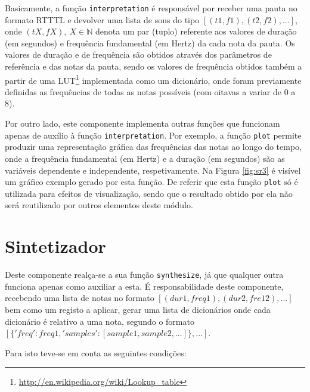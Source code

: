 \documentclass[a4paper,11pt,openright,oneside]{report}
\begin{document}
Basicamente, a função \verb|interpretation| é responsável por receber uma pauta no formato RTTTL e devolver uma lista de sons do tipo $[(t1, f1), (t2, f2), ...]$, onde $(tX, fX),\ X \in \mathbb{N}$ denota um par (tuplo) referente aos valores de duração (em segundos) e frequência fundamental (em Hertz) da cada nota da pauta. Os valores de duração e de frequência são obtidos através dos parâmetros de referência e das notas da pauta, sendo os valores de frequência obtidos também a partir de uma LUT\footnote{\url{http://en.wikipedia.org/wiki/Lookup_table}} implementada como um dicionário, onde foram previamente definidas as frequências de todas as notas possíveis (com oitavas a variar de 0 a 8).

Por outro lado, este componente implementa outras funções que funcionam apenas de auxílio à função \verb|interpretation|. Por exemplo, a função \verb|plot| permite produzir uma representação gráfica das frequências das notas ao longo do tempo, onde a frequência fundamental (em Hertz) e a duração (em segundos) são as variáveis dependente e independente, respetivamente. Na Figura \ref{fig:sr3} é visível um gráfico exemplo gerado por esta função. De referir que esta função \verb|plot| só é utilizada para efeitos de visualização, sendo que o resultado obtido por ela não será reutilizado por outros elementos deste módulo.

\section{Sintetizador}
\label{sec:synthesizer}

Deste componente realça-se a sua função \verb|synthesize|, já que qualquer outra funciona apenas como auxiliar a esta. É responsabilidade deste componente, recebendo uma lista de notas no formato $[(dur1, freq1), (dur2, fre12), ...]$ bem como um registo a aplicar, gerar uma lista de dicionários onde cada dicionário é relativo a uma nota, segundo o formato $[\{'freq': freq1, 'samples': [sample1, sample2, ...]\}, ...]$.

Para isto teve-se em conta as seguintes condições:
\end{document}
